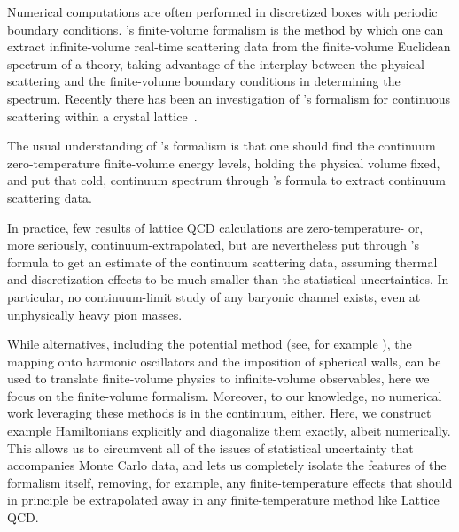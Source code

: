 Numerical computations are often performed in discretized boxes with periodic boundary conditions.
\Luscher's finite-volume formalism\cite{Hamber198399,luscher:1986I,luscher:1986II,wiese1989,Luscher1991,Luscher1991237} is the method by which one can extract infinite-volume real-time scattering data from the finite-volume Euclidean spectrum of a theory, taking advantage of the interplay between the physical scattering and the finite-volume boundary conditions in determining the spectrum.  Recently there has been an investigation of \Luscher's formalism for continuous scattering within a crystal lattice~\cite{Valiente:2015oya}.

The usual understanding of \Luscher's formalism is that one should find the continuum zero-temperature finite-volume energy levels, holding the physical volume fixed, and put that cold, continuum spectrum through \Luscher's formula to extract continuum scattering data. 

In practice, few results of lattice QCD calculations are zero-temperature- or, more seriously, continuum-extrapolated, but are nevertheless put through \Luscher's formula to get an estimate of the continuum scattering data, assuming thermal and discretization effects to be much smaller than the statistical uncertainties.
In particular, no continuum-limit study of any baryonic channel exists, even at unphysically heavy pion masses.

While alternatives, including the potential method (see, for example ), the mapping onto harmonic oscillators  and the imposition of spherical walls\cite{Borasoy:2007vy,Borasoy:2007vi,Lee:2008fa,Epelbaum:2008vj,Epelbaum:2010xt,Lu:2015riz,Elhatisari:2015iga,Elhatisari:2016owd,Elhatisari:2016hby,Klein:2018lqz,Li:2019ldq,Bovermann:2019jbt,Lahde:2019npb}, can be used to translate finite-volume physics to infinite-volume observables, here we focus on the \Luscher finite-volume formalism.
Moreover, to our knowledge, no numerical work leveraging these methods is in the continuum, either.  
Here, we construct example Hamiltonians explicitly and diagonalize them exactly, albeit numerically.
This allows us to circumvent all of the issues of statistical uncertainty that accompanies Monte Carlo data, and lets us completely isolate the features of the formalism itself, removing, for example, any finite-temperature effects that should in principle be extrapolated away in any finite-temperature method like Lattice QCD.

